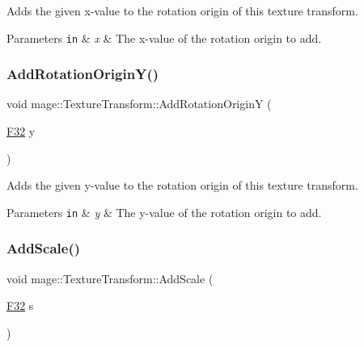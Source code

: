 Adds the given x-\/value to the rotation origin of this texture transform.


\begin{DoxyParams}[1]{Parameters}
\mbox{\tt in}  & {\em x} & The x-\/value of the rotation origin to add. \\
\hline
\end{DoxyParams}
\hypertarget{classmage_1_1_texture_transform_a5d3dd574b9471f4ae1162819abc394bf}{}\label{classmage_1_1_texture_transform_a5d3dd574b9471f4ae1162819abc394bf} 
\subsubsection{\texorpdfstring{Add\+Rotation\+Origin\+Y()}{AddRotationOriginY()}}
{\footnotesize\ttfamily void mage\+::\+Texture\+Transform\+::\+Add\+Rotation\+OriginY (\begin{DoxyParamCaption}\item[{\hyperlink{namespacemage_aa97e833b45f06d60a0a9c4fc22ae02c0}{F32}}]{y }\end{DoxyParamCaption})\hspace{0.3cm}{\ttfamily [noexcept]}}

Adds the given y-\/value to the rotation origin of this texture transform.


\begin{DoxyParams}[1]{Parameters}
\mbox{\tt in}  & {\em y} & The y-\/value of the rotation origin to add. \\
\hline
\end{DoxyParams}
\hypertarget{classmage_1_1_texture_transform_a494965e060dd40a1c86f5493d734c1a7}{}\label{classmage_1_1_texture_transform_a494965e060dd40a1c86f5493d734c1a7} 
\subsubsection{\texorpdfstring{Add\+Scale()}{AddScale()}\hspace{0.1cm}{\footnotesize\ttfamily [1/4]}}
{\footnotesize\ttfamily void mage\+::\+Texture\+Transform\+::\+Add\+Scale (\begin{DoxyParamCaption}\item[{\hyperlink{namespacemage_aa97e833b45f06d60a0a9c4fc22ae02c0}{F32}}]{s }\end{DoxyParamCaption})\hspace{0.3cm}{\ttfamily [noexcept]}}

